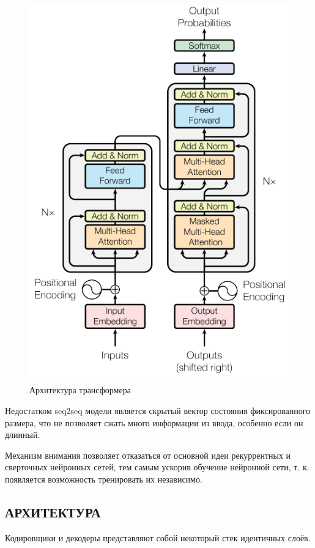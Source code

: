     \begin{figure}
        \centering
        \includegraphics[scale=1.2]{tex/png/transformer.png}
        \caption{Архитектура трансформера \cite{attention}}
        \label{fig:transformer}
    \end{figure}
    
    Недостатком seq2seq модели является скрытый вектор состояния фиксированного размера, что не позволяет сжать много информации из ввода, особенно если он длинный.

    Механизм внимания позволяет отказаться от основной идеи рекуррентных и сверточных нейронных сетей, тем самым ускорив обучение нейронной сети, т. к. появляется возможность тренировать их независимо.

\subsection{АРХИТЕКТУРА}
    Кодировщики и декодеры представляют собой некоторый стек идентичных слоёв. 
    
